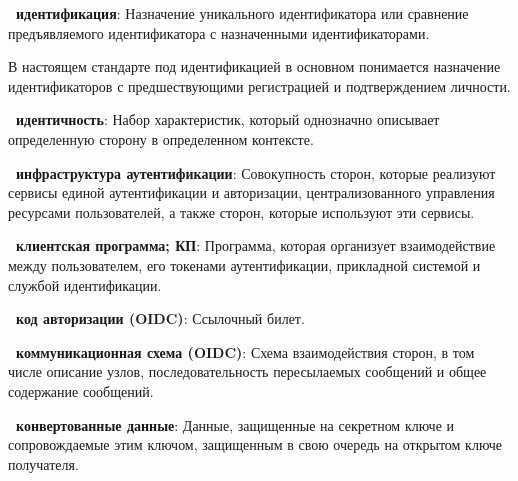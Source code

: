 {\bf \thedefctr~идентификация}: %
Назначение уникального идентификатора или сравнение предъявляемого 
идентификатора с назначенными идентификаторами.

\begin{note*}
В настоящем стандарте под идентификацией в основном понимается назначение
идентификаторов с предшествующими регистрацией и подтверждением личности.
\end{note*}

{\bf \thedefctr~идентичность}:
Набор характеристик, который однозначно описывает определенную сторону в 
определенном контексте.






{\bf \thedefctr~инфраструктура аутентификации}:
Совокупность сторон, которые реализуют сервисы единой аутентификации и 
авторизации, централизованного управления ресурсами пользователей,
а также сторон, которые используют эти сервисы.

{\bf \thedefctr~клиентская программа; КП}:
Программа, которая организует взаимодействие между пользователем,
его токенами аутентификации, прикладной системой и службой идентификации.


{\bf \thedefctr~код авторизации (OIDC)}:
Ссылочный билет.

{\bf \thedefctr~коммуникационная схема (OIDC)}:
Схема взаимодействия сторон, в том числе описание узлов,
последовательность пересылаемых сообщений и общее 
содержание сообщений.

{\bf \thedefctr~конвертованные данные}: %
Данные, защищенные на секретном ключе и сопровождаемые этим ключом, 
защищенным в свою очередь на открытом ключе получателя.

